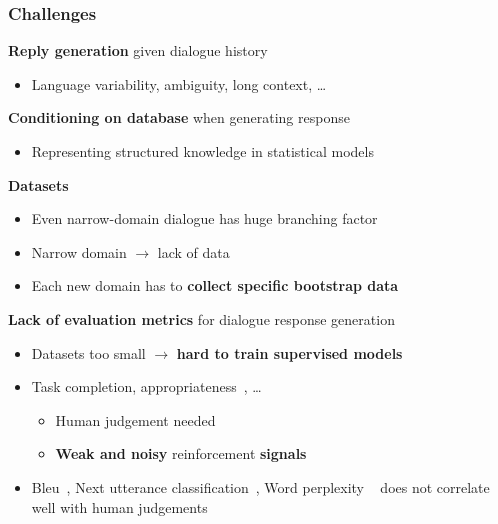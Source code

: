 \documentclass[10pt, compress,british,xcolor={svgnames,dvipsnames,x11names},trans]{beamer}
\begin{document}
\begin{frame}\frametitle{Challenges}
            {\bf \color{blue} Reply generation} given dialogue history
            \\
            \begin{itemize}
                \item Language variability, ambiguity, long context, \dots
            \end{itemize}
            {\bf \color{blue} Conditioning on database} when generating response 
            \\
            \begin{itemize}
                \item Representing structured knowledge in statistical models
            \end{itemize}
            {\bf \color{blue} Datasets}
            \\
            \begin{itemize}
                \item Even narrow-domain  dialogue has huge branching factor
                \item Narrow domain $\longrightarrow$ lack of data
                \item Each new domain has to {\bf collect specific bootstrap data}
            \end{itemize}
            {\bf \color{blue} Lack of evaluation metrics} for dialogue response generation
            \\
            \begin{itemize}
                \item Datasets too small $\longrightarrow$ {\bf hard to train supervised models}
                \item Task completion, appropriateness~\cite{bohus2007error}, \dots 
                \begin{itemize}
                    \item Human judgement needed \item {\bf Weak and noisy} reinforcement {\bf signals}
                \end{itemize}
            \item Bleu~\cite{papineni_bleu_2002}, Next utterance classification~\cite{lowe_evaluation_2016}, Word perplexity
                ~\cite{mikolov_recurrent_2010} 
                does not correlate well with human judgements
            \end{itemize}
\end{frame}
\end{document}
